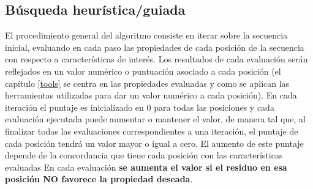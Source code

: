 




\subsection{Búsqueda heurística/guiada}




El procedimiento general del algoritmo consiste en iterar sobre la secuencia inicial, evaluando en cada paso las propiedades de cada posición de la secuencia con respecto a características de interés. 
Los resultados de cada evaluación serán reflejados en un valor numérico o puntuación asociado a cada posición
(el capítulo \ref{tools} se centra en las propiedades evaluadas y como se aplican las herramientas utilizadas para dar un valor numérico a cada posición). 
En cada iteración el puntaje es inicializado en 0 para todas las posiciones y cada evaluación ejecutada puede aumentar o mantener el valor, de manera tal que, 
al finalizar todas las evaluaciones correspondientes a una iteración, el puntaje de cada posición tendrá un valor mayor o igual a cero.
El aumento de este puntaje depende de la concordancia que tiene cada posición con las características evaluadas
En cada evaluación \textbf{se aumenta el valor si el residuo en esa posición NO favorece la propiedad deseada}.

